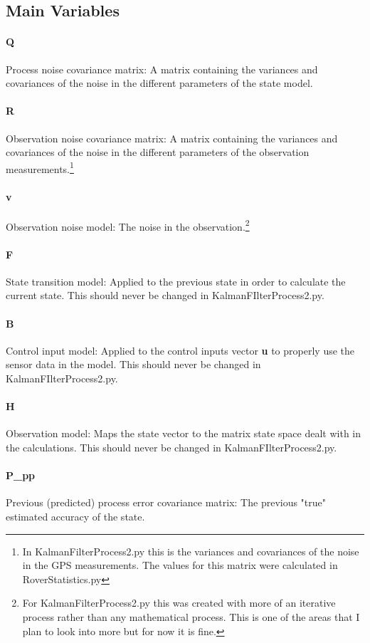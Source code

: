 \documentclass{article}
\begin{document}
\subsection{Main Variables}
\paragraph{Q}
Process noise covariance matrix: A matrix containing the variances and covariances of the noise in the different parameters of the state model.
\paragraph{R}
Observation noise covariance matrix: A matrix containing the variances and covariances of the noise in the different parameters of the observation measurements.\footnote{In KalmanFilterProcess2.py this is the variances and covariances of the noise in the GPS measurements. The values for this matrix were calculated in RoverStatistics.py}
\paragraph{v}
Observation noise model: The noise in the observation.\footnote{For KalmanFilterProcess2.py this was created with more of an iterative process rather than any mathematical process. This is one of the areas that I plan to look into more but for now it is fine.}
\paragraph{F}
State transition model: Applied to the previous state in order to calculate the current state. This should never be changed in KalmanFIlterProcess2.py.
\paragraph{B}
Control input model: Applied to the control inputs vector \textbf{u} to properly use the sensor data in the model. This should never be changed in KalmanFIlterProcess2.py.
\paragraph{H}
Observation model: Maps the state vector to the matrix state space dealt with in the calculations. This should never be changed in KalmanFIlterProcess2.py.
\paragraph{P\_pp}
Previous (predicted) process error covariance matrix: The previous "true" estimated accuracy of the state. 
\end{document}
